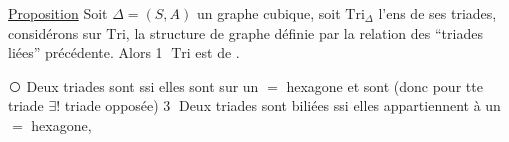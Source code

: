 
\uline{Proposition} Soit $\Delta=(S,A)$ un graphe cubique, soit
$\mathrm{Tri}_{\Delta}$ l'ens de ses triades, considérons sur $\mathrm{Tri}$, la structure
de graphe définie par la relation des ``triades liées''
précédente. Alors \textcircled{\scriptsize 1} $\mathrm{Tri}$ est   de
  .

\textcircled{\scriptsize{}} Deux triades sont   ssi elles sont sur un $=$ hexagone et  sont   (donc pour tte triade $\exists!$ triade opposée)
\textcircled{\scriptsize 3} Deux triades  sont biliées ssi elles appartiennent à un $=$  hexagone,
